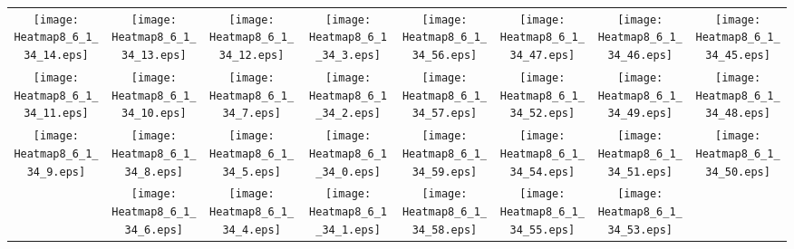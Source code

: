 \documentclass{standalone}
\begin{document}
\begin{tabular}{ *8{c} }
\texttt{[image: Heatmap8\_6\_1\_34\_14.eps]} & \texttt{[image: Heatmap8\_6\_1\_34\_13.eps]} & \texttt{[image: Heatmap8\_6\_1\_34\_12.eps]} & \texttt{[image: Heatmap8\_6\_1\_34\_3.eps]} & \texttt{[image: Heatmap8\_6\_1\_34\_56.eps]} & \texttt{[image: Heatmap8\_6\_1\_34\_47.eps]} & \texttt{[image: Heatmap8\_6\_1\_34\_46.eps]} & \texttt{[image: Heatmap8\_6\_1\_34\_45.eps]} \\
\texttt{[image: Heatmap8\_6\_1\_34\_11.eps]} & \texttt{[image: Heatmap8\_6\_1\_34\_10.eps]} & \texttt{[image: Heatmap8\_6\_1\_34\_7.eps]} & \texttt{[image: Heatmap8\_6\_1\_34\_2.eps]} & \texttt{[image: Heatmap8\_6\_1\_34\_57.eps]} & \texttt{[image: Heatmap8\_6\_1\_34\_52.eps]} & \texttt{[image: Heatmap8\_6\_1\_34\_49.eps]} & \texttt{[image: Heatmap8\_6\_1\_34\_48.eps]} \\
\texttt{[image: Heatmap8\_6\_1\_34\_9.eps]} & \texttt{[image: Heatmap8\_6\_1\_34\_8.eps]} & \texttt{[image: Heatmap8\_6\_1\_34\_5.eps]} & \texttt{[image: Heatmap8\_6\_1\_34\_0.eps]} & \texttt{[image: Heatmap8\_6\_1\_34\_59.eps]} & \texttt{[image: Heatmap8\_6\_1\_34\_54.eps]} & \texttt{[image: Heatmap8\_6\_1\_34\_51.eps]} & \texttt{[image: Heatmap8\_6\_1\_34\_50.eps]} \\
 & \texttt{[image: Heatmap8\_6\_1\_34\_6.eps]} & \texttt{[image: Heatmap8\_6\_1\_34\_4.eps]} & \texttt{[image: Heatmap8\_6\_1\_34\_1.eps]} & \texttt{[image: Heatmap8\_6\_1\_34\_58.eps]} & \texttt{[image: Heatmap8\_6\_1\_34\_55.eps]} & \texttt{[image: Heatmap8\_6\_1\_34\_53.eps]} &  
\end{tabular}
\end{document}

